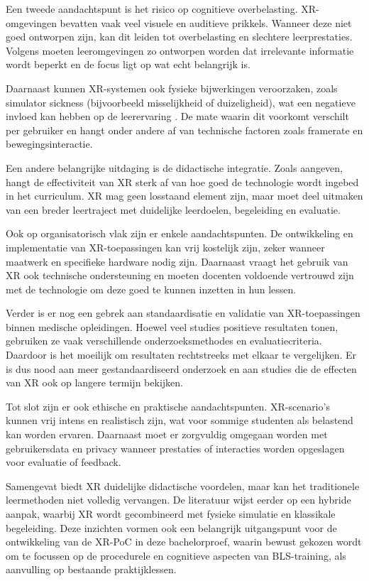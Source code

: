 Een tweede aandachtspunt is het risico op cognitieve overbelasting. XR-omgevingen bevatten vaak veel visuele en auditieve prikkels. Wanneer deze niet goed ontworpen zijn, kan dit leiden tot overbelasting en slechtere leerprestaties. Volgens \textcite{Mayer2009Multimedia} moeten leeromgevingen zo ontworpen worden dat irrelevante informatie wordt beperkt en de focus ligt op wat echt belangrijk is.

Daarnaast kunnen XR-systemen ook fysieke bijwerkingen veroorzaken, zoals simulator sickness (bijvoorbeeld misselijkheid of duizeligheid), wat een negatieve invloed kan hebben op de leerervaring \autocite{Kennedy1993SSQ}. De mate waarin dit voorkomt verschilt per gebruiker en hangt onder andere af van technische factoren zoals framerate en bewegingsinteractie.

Een andere belangrijke uitdaging is de didactische integratie. Zoals \textcite{Radianti2020VRHE} aangeven, hangt de effectiviteit van XR sterk af van hoe goed de technologie wordt ingebed in het curriculum. XR mag geen losstaand element zijn, maar moet deel uitmaken van een breder leertraject met duidelijke leerdoelen, begeleiding en evaluatie.

Ook op organisatorisch vlak zijn er enkele aandachtspunten. De ontwikkeling en implementatie van XR-toepassingen kan vrij kostelijk zijn, zeker wanneer maatwerk en specifieke hardware nodig zijn. Daarnaast vraagt het gebruik van XR ook technische ondersteuning en moeten docenten voldoende vertrouwd zijn met de technologie om deze goed te kunnen inzetten in hun lessen.

Verder is er nog een gebrek aan standaardisatie en validatie van XR-toepassingen binnen medische opleidingen. Hoewel veel studies positieve resultaten tonen, gebruiken ze vaak verschillende onderzoeksmethodes en evaluatiecriteria. Daardoor is het moeilijk om resultaten rechtstreeks met elkaar te vergelijken. Er is dus nood aan meer gestandaardiseerd onderzoek en aan studies die de effecten van XR ook op langere termijn bekijken.

Tot slot zijn er ook ethische en praktische aandachtspunten. XR-scenario’s kunnen vrij intens en realistisch zijn, wat voor sommige studenten als belastend kan worden ervaren. Daarnaast moet er zorgvuldig omgegaan worden met gebruikersdata en privacy wanneer prestaties of interacties worden opgeslagen voor evaluatie of feedback.

Samengevat biedt XR duidelijke didactische voordelen, maar kan het traditionele leermethoden niet volledig vervangen. De literatuur wijst eerder op een hybride aanpak, waarbij XR wordt gecombineerd met fysieke simulatie en klassikale begeleiding. Deze inzichten vormen ook een belangrijk uitgangspunt voor de ontwikkeling van de XR-PoC in deze bachelorproef, waarin bewust gekozen wordt om te focussen op de procedurele en cognitieve aspecten van BLS-training, als aanvulling op bestaande praktijklessen.

